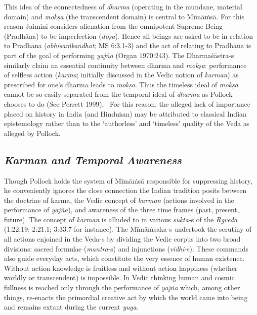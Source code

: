 This idea of the connectedness of \textit{dharma} (operating in the mundane, material domain) and \textit{mokṣa} (the transcendent domain) is central to Mīmāṁsā. For this reason Jaimini considers alienation from the omnipotent Supreme Being (Pradhāna) to be imperfection (\textit{doṣa}). Hence all beings are asked to be in relation to Pradhāna (\textit{abhisaṁbandhāt}; MS 6:3.1-3) and the act of relating to Pradhāna is part of the goal of performing \textit{yajña} (Organ 1970:243). The \hbox{Dharmaśāstra-s} similarly claim an essential continuity between dharma and \textit{mokṣa}: performance of selfless action (\textit{karma}; initially discussed in the Vedic notion of \textit{karman}) as prescribed for one's dharma leads to \textit{mokṣa}. Thus the timeless ideal of \textit{mokṣa} cannot be so easily separated from the temporal ideal of \textit{dharma} as Pollock chooses to do (See Perrett 1999).  For this reason, the alleged lack of importance placed on history in India (and Hinduism) may be attributed to classical Indian epistemology rather than to the ‘authorless’ and ‘timeless’ quality of the Veda as alleged by Pollock.

\subsection*{\textit{Karman and Temporal Awareness}}

\vskip 2pt

Though Pollock holds the system of Mīmāṁsā responsible for suppressing history, he conveniently ignores the close connection the Indian tradition posits between the doctrine of karma, the Vedic concept of \textit{karman} (actions involved in the performance of \textit{yajña}), and awareness of the three time frames (past, present, future). The concept of \textit{karman} is alluded to in various \textit{sūkta-}s of the \textit{Ṛgveda} (1:22.19; 2:21.1; 3:33.7 for instance). The Mīmāṁsaka-s undertook the scrutiny of all actions enjoined in the Veda-s by dividing the Vedic corpus into two broad divisions: sacred formulae (\textit{mantra}-s) and injunctions (\textit{vidhi-}s). These commands also guide everyday acts, which constitute the very essence of human existence. Without action knowledge is fruitless and without action happiness (whether worldly or transcendent) is impossible. In Vedic thinking human and cosmic fullness is reached only through the performance of \textit{yajña} which, among other things, re-enacts the primordial creative act by which the world came into being and remains extant during the current \textit{yuga}.

